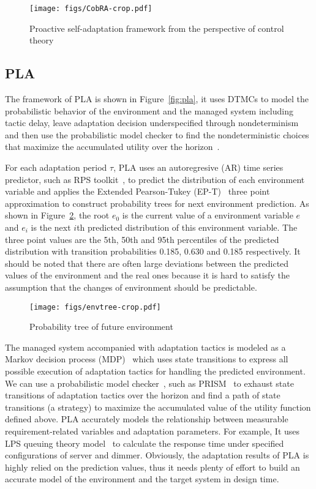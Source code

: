 \documentclass[sigconf]{acmart}
\begin{document}
	\begin{figure}[!htp]
		\centering	
		\texttt{[image: figs/CobRA-crop.pdf]}	
		\caption{Proactive self-adaptation framework from the perspective of control theory}
		\label{fig:mpc}
	\end{figure}
	\subsection{PLA}
	The framework of PLA is shown in Figure~\ref{fig:pla}, it uses DTMCs to model the probabilistic behavior of the environment and the managed system including tactic delay, leave adaptation decision underspecified through nondeterminism and then use the probabilistic model checker to find the nondeterministic choices that maximize the accumulated utility over the horizon~\cite{moreno2015proactive}. 
	
	For each adaptation period $\tau$, PLA uses an autoregresive (AR) time series predictor, such as RPS toolkit~\cite{dinda2006design}, to predict the distribution of each environment variable and applies the Extended Pearson-Tukey (EP-T)~\cite{keefer1994certainty} three point approximation to construct probability trees for next environment prediction. As shown in Figure~\ref{fig:envtree}, the root $e_{0}$ is the current value of a environment variable $e$ and $e_{i}$ is the next $i$th predicted distribution of this environment variable. The three point values are the 5th, 50th and 95th percentiles of the predicted distribution with transition probabilities 0.185, 0.630 and 0.185 respectively. It should be noted that there are often large deviations between the predicted values of the environment and the real ones because it is hard to satisfy the assumption that the changes of environment should be predictable. 
	
	\begin{figure}[!htp]
		\centering	
		\texttt{[image: figs/envtree-crop.pdf]}	
		\caption{Probability tree of future environment}
		\label{fig:envtree}
	\end{figure}
	
	The managed system accompanied with adaptation tactics is modeled as a Markov decision process (MDP)~\cite{puterman2014markov} which uses state transitions to express all possible execution of adaptation tactics for handling the predicted environment. We can use a probabilistic model checker~\cite{moreno2015proactive}, such as PRISM~\cite{kwiatkowska2011prism} to exhaust state transitions of adaptation tactics over the horizon and find a path of state transitions (a strategy) to maximize the accumulated value of the utility function defined above. PLA accurately models the relationship between measurable requirement-related variables and adaptation parameters. For example, It uses LPS queuing theory model~\cite{zhang2008steady} to calculate the response time under specified configurations of server and dimmer. Obviously, the adaptation results of PLA is highly relied on the prediction values, thus it needs plenty of effort to build an accurate model of the environment and the target system in design time. 
	
\end{document}

